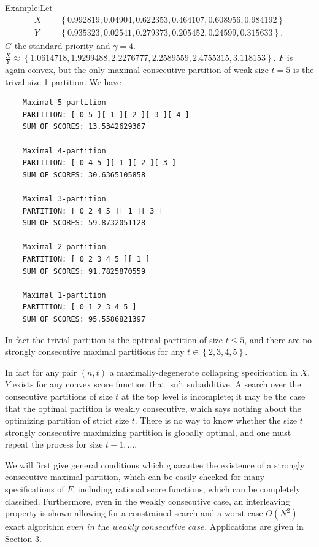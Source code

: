 \documentclass{article}
\theoremstyle{case}
\newenvironment{example}[1]{\par\noindent\underline{Example:}\space#1}{}
\begin{document}
\begin{example}
Let 
\begin{align*}
X & = \left\lbrace 0.992819, 0.04904, 0.622353, 0.464107, 0.608956, 0.984192 \right\rbrace \\
Y & = \left\lbrace 0.935323, 0.02541, 0.279373, 0.205452, 0.24599, 0.315633 \right\rbrace,
\end{align*}
$G$ the standard priority and $\gamma = 4$. $\frac{X}{Y} \approx \left\lbrace 1.0614718, 1.9299488, 2.2276777, 2.2589559, 2.4755315, 3.118153 \right\rbrace$. $F$ is again convex, but the only maximal consecutive partition of weak size $t = 5$ is the trival size-1 partition. We have

\begin{verbatim}
    Maximal 5-partition
    PARTITION: [ 0 5 ][ 1 ][ 2 ][ 3 ][ 4 ]
    SUM OF SCORES: 13.5342629367

    Maximal 4-partition
    PARTITION: [ 0 4 5 ][ 1 ][ 2 ][ 3 ]
    SUM OF SCORES: 30.6365105858

    Maximal 3-partition
    PARTITION: [ 0 2 4 5 ][ 1 ][ 3 ]
    SUM OF SCORES: 59.8732051128

    Maximal 2-partition
    PARTITION: [ 0 2 3 4 5 ][ 1 ]
    SUM OF SCORES: 91.7825870559

    Maximal 1-partition
    PARTITION: [ 0 1 2 3 4 5 ]
    SUM OF SCORES: 95.5586821397
\end{verbatim}
In fact the trivial partition is the optimal partition of size $t \leq 5$, and there are no strongly consecutive maximal partitions for any $t \in \left\lbrace 2, 3, 4, 5\right\rbrace$.

\end{example}

In fact for any pair $\left( n, t\right)$ a maximally-degenerate collapsing specification in $X$, $Y$ exists for any convex score function that isn't subadditive. A search over the consecutive partitions of size $t$ at the top level is incomplete; it may be the case that the optimal partition is weakly consecutive, which says nothing about the optimizing partition of strict size $t$. There is no way to know whether the size $t$ strongly consecutive maximizing partition is globally optimal, and one must repeat the process for size $t-1, \dots$. 

\vspace{4pt}

We will first give general conditions which guarantee the existence of a strongly consecutive maximal partition, which can be easily checked for many specifications of $F$, including rational score functions, which can be completely classified. Furthermore, even in the weakly consecutive case, an interleaving property is shown allowing for a constrained search and a worst-case $O(N^2)$ exact algorithm $\textit{even in the weakly consecutive case}$. Applications are given in Section 3.
\end{document}
